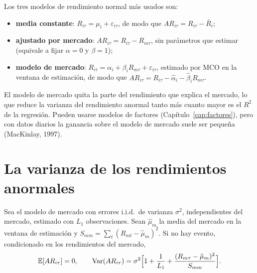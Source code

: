 Los tres modelos de rendimiento normal más usados son:
\begin{itemize}[leftmargin=*]
  \item \textbf{media constante}: $R_{i\tau}=\mu_i+\varepsilon_{i\tau}$, de modo que $AR_{i\tau}=R_{i\tau}-\bar R_i$;
  \item \textbf{ajustado por mercado}: $AR_{i\tau}=R_{i\tau}-R_{m\tau}$, sin parámetros que estimar (equivale a fijar
        $\alpha=0$ y $\beta=1$);
  \item \textbf{modelo de mercado}: $R_{i\tau}=\alpha_i+\beta_iR_{m\tau}+\varepsilon_{i\tau}$, estimado por MCO en la
        ventana de estimación, de modo que $AR_{i\tau}=R_{i\tau}-\hat\alpha_i-\hat\beta_iR_{m\tau}$.
\end{itemize}
El modelo de mercado quita la parte del rendimiento que explica el mercado, lo que reduce la varianza del rendimiento
anormal tanto más cuanto mayor es el $R^2$ de la regresión. Pueden usarse modelos de factores (Capítulo~\ref{cap:factores}),
pero con datos diarios la ganancia sobre el modelo de mercado suele ser pequeña (MacKinlay, 1997).

\section{La varianza de los rendimientos anormales}

\begin{proposicion}\label{prop:varar}
Sea el modelo de mercado con errores i.i.d.\ de varianza $\sigma^2$, independientes del mercado, estimado con $L_1$
observaciones. Sean $\hat\mu_m$ la media del mercado en la ventana de estimación y
$S_{mm}=\sum_{t}(R_{mt}-\hat\mu_m)^2$. Si no hay evento, condicionado en los rendimientos del mercado,
\[
  \mathbb{E}[AR_{i\tau}]=0,\qquad
  \operatorname{Var}(AR_{i\tau})=\sigma^2\Bigl[1+\frac1{L_1}+\frac{(R_{m\tau}-\hat\mu_m)^2}{S_{mm}}\Bigr].
\]
\end{proposicion}

